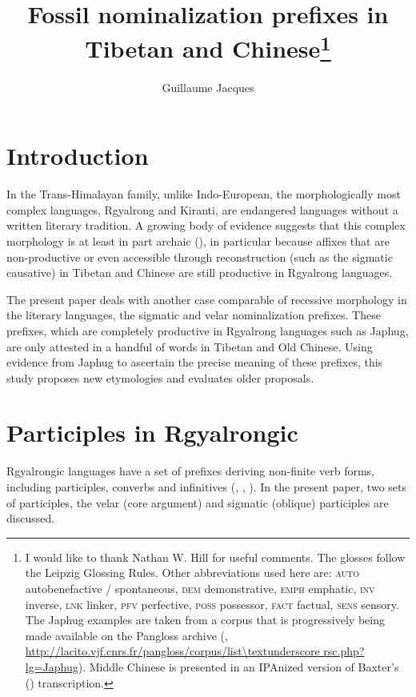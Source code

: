 \documentclass[oneside,a4paper,11pt]{article}
\begin{document}
\title{Fossil nominalization prefixes in Tibetan and Chinese\footnote{I would like to thank Nathan W. Hill for useful comments. The glosses follow the Leipzig Glossing Rules. Other abbreviations used here are:  \textsc{auto} autobenefactive / spontaneous,  \textsc{dem} demonstrative,  \textsc{emph} emphatic, \textsc{inv} inverse,  \textsc{lnk} linker, \textsc{pfv} perfective, \textsc{poss} possessor, \textsc{fact} factual,  \textsc{sens} sensory. The Japhug examples are taken from a corpus that is progressively being made available on the Pangloss archive (\citealt{michailovsky14pangloss},  
 \url{http://lacito.vjf.cnrs.fr/pangloss/corpus/list\textunderscore rsc.php?lg=Japhug}). Middle Chinese is presented in an IPAnized version of Baxter's (\citeyear{baxter92}) transcription.}}
\author{Guillaume Jacques}
\maketitle

\section{Introduction}
  In the Trans-Himalayan family, unlike Indo-European, the morphologically most complex languages, Rgyalrong and Kiranti, are endangered languages without a written literary tradition. A growing body of evidence suggests that this complex morphology is at least in part archaic (\citealt{jacques12agreement, delancey14second, jacques16ssuffixes, gong17xingtaixue}), in particular because affixes that are non-productive or even accessible through reconstruction (such as the sigmatic causative) in Tibetan and Chinese are still productive in Rgyalrong languages.

The present paper deals with another case comparable of recessive morphology in the literary languages, the sigmatic and velar nominalization prefixes. These prefixes, which are completely productive in Rgyalrong languages such as Japhug, are only attested in a handful of words in Tibetan and Old Chinese. Using evidence from Japhug to ascertain the precise meaning of these prefixes, this study proposes new etymologies and evaluates older proposals.

\section{Participles in Rgyalrongic}
Rgyalrongic languages have a set of prefixes deriving non-finite verb forms, including participles, converbs and infinitives (\citealt{jacques14linking}, \citealt{jackson14morpho}, \citealt{jacques16relatives}). In the present paper, two sets of participles, the velar (core argument) and sigmatic (oblique) participles are discussed.
\end{document}
